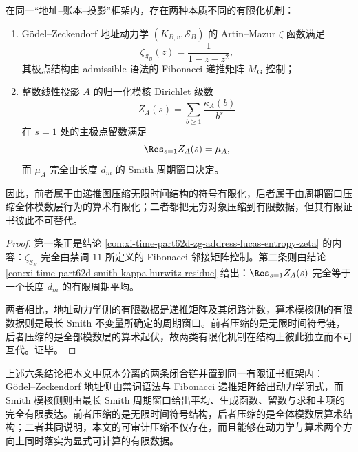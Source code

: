 \begin{conclusion}\label{con:xi-time-part62d-dynamical-arithmetic-finitization-separation}
在同一“地址--账本--投影”框架内，存在两种本质不同的有限化机制：
\begin{enumerate}
  \item Gödel--Zeckendorf 地址动力学 \((K_{B,v},\mathcal S_B)\) 的 Artin--Mazur \(\zeta\) 函数满足
  \[
  \zeta_{\mathcal S_B}(z)=\frac{1}{1-z-z^2},
  \]
  其极点结构由 admissible 语法的 Fibonacci 递推矩阵 \(M_{\mathrm G}\) 控制；
  \item 整数线性投影 \(A\) 的归一化模核 Dirichlet 级数
  \[
  Z_A(s)=\sum_{b\ge 1}\frac{\kappa_A(b)}{b^s}
  \]
  在 \(s=1\) 处的主极点留数满足
  \[
  \Res_{s=1}Z_A(s)=\mu_A,
  \]
  而 \(\mu_A\) 完全由长度 \(d_m\) 的 Smith 周期窗口决定。
\end{enumerate}
因此，前者属于由递推图压缩无限时间结构的符号有限化，后者属于由周期窗口压缩全体模数层行为的算术有限化；二者都把无穷对象压缩到有限数据，但其有限证书彼此不可替代。
\end{conclusion}
\begin{proof}
第一条正是结论 \ref{con:xi-time-part62d-zg-address-lucas-entropy-zeta} 的内容：\(\zeta_{\mathcal S_B}\) 完全由禁词 \(11\) 所定义的 Fibonacci 邻接矩阵控制。第二条则由结论 \ref{con:xi-time-part62d-smith-kappa-hurwitz-residue} 给出：\(\Res_{s=1}Z_A(s)\) 完全等于一个长度 \(d_m\) 的有限周期平均。

两者相比，地址动力学侧的有限数据是递推矩阵及其闭路计数，算术模核侧的有限数据则是最长 Smith 不变量所确定的周期窗口。前者压缩的是无限时间符号链，后者压缩的是全部模数层的算术起伏，故两类有限化机制在结构上彼此独立而不可互代。证毕。
\end{proof}

\noindent
上述六条结论把本文中原本分离的两条闭合链并置到同一有限证书框架内：Gödel--Zeckendorf 地址侧由禁词语法与 Fibonacci 递推矩阵给出动力学闭式，而 Smith 模核侧则由最长 Smith 周期窗口给出平均、生成函数、留数与求和主项的完全有限表达。前者压缩的是无限时间符号结构，后者压缩的是全体模数层算术结构；二者共同说明，本文的可审计压缩不仅存在，而且能够在动力学与算术两个方向上同时落实为显式可计算的有限数据。

\endinput
